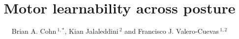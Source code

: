 \documentclass[utf8]{frontiersSCNS} %
\def\firstAuthorLast{Sample {et~al.}} %
\def\Authors{Brian A. Cohn\,$^{1,*}$, Kian Jalaleddini\,$^{2}$ and Francisco J. Valero-Cuevas\,$^{1,2}$}
\begin{document}
\onecolumn
{}

\title[Motor learnability across posture]{Motor learnability across posture}

\author[\firstAuthorLast ]{\Authors} %
\address{} %
\correspondance{} %
\extraAuth{}%


\maketitle
\end{document}
